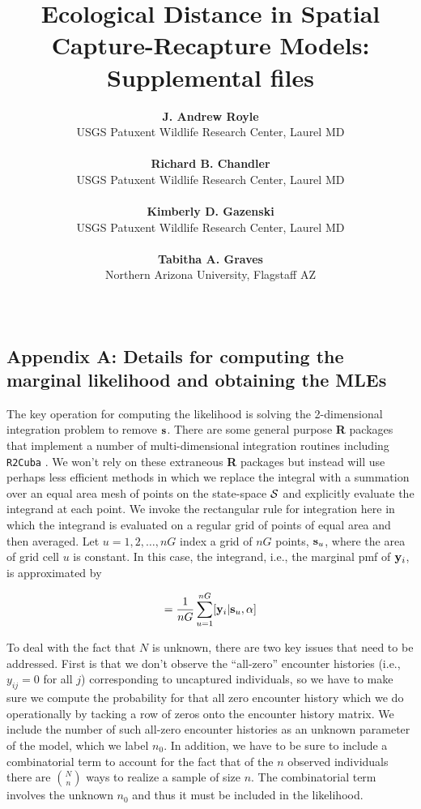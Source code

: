 \documentclass[12pt]{article}
\title{Ecological Distance in Spatial Capture-Recapture Models: Supplemental 
files}
\author{
{\bf J. Andrew Royle}\\
USGS Patuxent Wildlife Research Center, Laurel MD \\ \\
{\bf Richard B. Chandler} \\
USGS Patuxent Wildlife Research Center, Laurel MD\\ \\
{\bf Kimberly D. Gazenski} \\
USGS Patuxent Wildlife Research Center, Laurel MD\\ \\
{\bf Tabitha A. Graves} \\
Northern Arizona University, Flagstaff AZ \\ \\
}
\begin{document}
\maketitle

\date

\newpage

\linenumbers


\begin{spacing}{1.2}



\section*{Appendix A: Details for computing the marginal likelihood
  and obtaining the MLEs}


The key operation for computing the likelihood is solving the
2-dimensional integration problem to remove ${\bf s}$. There are some
general purpose {\bf R} packages that implement a number of
multi-dimensional integration routines including 
\mbox{\tt R2Cuba} \citep{hahn_etal:2011}.
We won't rely on these extraneous {\bf R} packages but instead will
use perhaps less efficient methods in which we replace the integral
with a summation over an equal area mesh of points on the state-space
${\cal S}$ and explicitly evaluate the integrand at each point. We
invoke the rectangular rule for integration here in which the
integrand is evaluated on a regular grid of points of equal area and
then averaged.  Let $u=1,2,\ldots,nG$ index a grid of $nG$ points,
${\bf s}_{u}$, where the area of grid cell $u$ is constant.  In this
case, the integrand, i.e., the marginal pmf of ${\bf y}_{i}$, is
approximated by

\begin{equation}
         [{\bf y}_{i}|\alpha] = \frac{1}{nG} \sum_{u=1}^{nG}  [ {\bf
            y}_{i} |{\bf s}_u, \alpha]
\label{mle.eq.intlik}
\end{equation}

To deal with the fact that $N$ is unknown, there are two key issues
that need to be addressed.  First is that we don't observe the
``all-zero'' encounter histories (i.e., $y_{ij} = 0$ for all $j$)
corresponding to uncaptured individuals, so we have to make sure we
compute the probability for that all zero encounter history which we
do operationally by tacking a row of zeros onto the encounter history
matrix. We include the number of such all-zero encounter histories as
an unknown parameter of the model, which we label $n_{0}$.  In
addition, we have to be sure to include a combinatorial term to
account for the fact that of the $n$ observed individuals there are
${N \choose n}$ ways to realize a sample of size $n$. The
combinatorial term involves the unknown $n_{0}$ and thus it must be
included in the likelihood.


\end{spacing}
\end{document}
